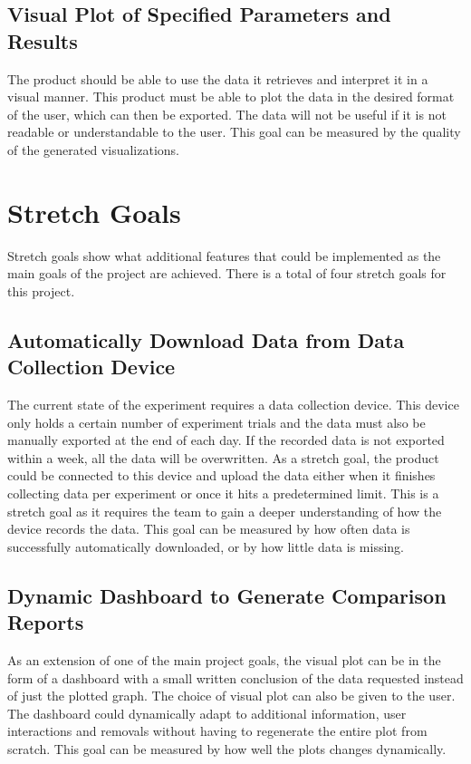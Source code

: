 \documentclass{article}
\begin{document}
\subsection{Visual Plot of Specified Parameters and Results}
The product should be able to use the data it retrieves and interpret it in a
visual manner. This product must be able to plot the data in the desired format
of the user, which can then be exported. The data will not be useful if it is
not readable or understandable to the user. This goal can be measured by the
quality of the generated visualizations.

\section{Stretch Goals}
Stretch goals show what additional features that could be implemented as the
main goals of the project are achieved. There is a total of four stretch goals
for this project.
\subsection{Automatically Download Data from Data Collection Device}
The current state of the experiment requires a data collection device. This
device only holds a certain number of experiment trials and the data must also
be manually exported at the end of each day. If the recorded data is not
exported within a week, all the data will be overwritten. As a stretch goal, the
product could be connected to this device and upload the data either when it
finishes collecting data per experiment or once it hits a predetermined limit.
This is a stretch goal as it requires the team to gain a deeper understanding of
how the device records the data. This goal can be measured by how often data is
successfully automatically downloaded, or by how little data is missing.

\subsection{Dynamic Dashboard to Generate Comparison Reports}
As an extension of one of the main project goals, the visual plot can be in the
form of a dashboard with a small written conclusion of the data requested
instead of just the plotted graph. The choice of visual plot can also be given
to the user. The dashboard could dynamically adapt to additional information,
user interactions and removals without having to regenerate the entire plot from
scratch. This goal can be measured by how well the plots changes dynamically.
\end{document}
